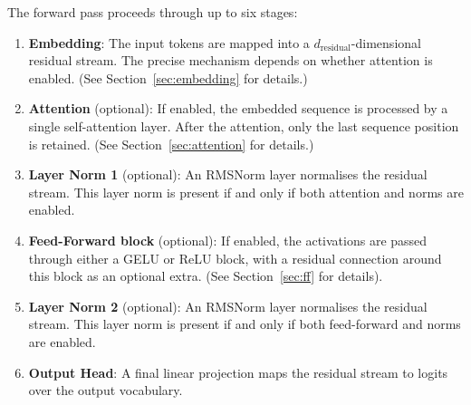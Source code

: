 \documentclass[11pt,a4paper]{article}
\begin{document}
The forward pass proceeds through up to six stages:
\begin{enumerate}
    \item \textbf{Embedding}: The input tokens are mapped into a $d_\text{residual}$-dimensional residual stream. The precise mechanism depends on whether attention is enabled. (See Section~\ref{sec:embedding} for details.)
    \item \textbf{Attention} (optional): If enabled, the embedded sequence is processed by a single self-attention layer. After the attention, only the last sequence position is retained. (See Section~\ref{sec:attention} for details.)
    \item \textbf{Layer Norm 1} (optional): An RMSNorm layer normalises the residual stream. This layer norm is present if and only if both attention and norms are enabled.
    \item \textbf{Feed-Forward block} (optional): If enabled, the activations are passed through either a GELU or ReLU block, with a residual connection around this block as an optional extra. (See Section~\ref{sec:ff} for details).
    \item \textbf{Layer Norm 2} (optional): An RMSNorm layer normalises the residual stream. This layer norm is present if and only if both feed-forward and norms are enabled.
    \item \textbf{Output Head}: A final linear projection maps the residual stream to logits over the output vocabulary. 
\end{enumerate}
\end{document}
